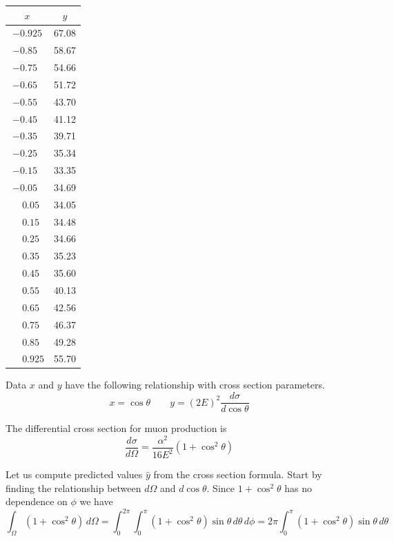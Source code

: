 \documentclass[12pt]{article}
\begin{document}
\begin{center}
\begin{tabular}{|c|c|}
\hline
$x$ & $y$\\
\hline
$-0.925$ & 67.08\\
$-0.85\phantom{0}$ & 58.67\\
$-0.75\phantom{0}$ & 54.66\\
$-0.65\phantom{0}$ & 51.72\\
$-0.55\phantom{0}$ & 43.70\\
$-0.45\phantom{0}$ & 41.12\\
$-0.35\phantom{0}$ & 39.71\\
$-0.25\phantom{0}$ & 35.34\\
$-0.15\phantom{0}$ & 33.35\\
$-0.05\phantom{0}$ & 34.69\\
$\phantom{+}0.05\phantom{0}$ & 34.05\\
$\phantom{+}0.15\phantom{0}$ & 34.48\\
$\phantom{+}0.25\phantom{0}$ & 34.66\\
$\phantom{+}0.35\phantom{0}$ & 35.23\\
$\phantom{+}0.45\phantom{0}$ & 35.60\\
$\phantom{+}0.55\phantom{0}$ & 40.13\\
$\phantom{+}0.65\phantom{0}$ & 42.56\\
$\phantom{+}0.75\phantom{0}$ & 46.37\\
$\phantom{+}0.85\phantom{0}$ & 49.28\\
$\phantom{+}0.925$ & 55.70\\
\hline
\end{tabular}
\end{center}

\noindent
Data $x$ and $y$ have the following relationship with cross section parameters.
\begin{equation*}
x=\cos\theta
\qquad
y=(2E)^2\frac{d\sigma}{d\cos\theta}
\end{equation*}

\noindent
The differential cross section for muon production is
\begin{equation*}
\frac{d\sigma}{d\Omega}=\frac{\alpha^2}{16E^2}(1+\cos^2\theta)
\end{equation*}

\noindent
Let us compute predicted values $\hat{y}$ from the cross section formula.
Start by finding the relationship between $d\Omega$ and $d\cos\theta$.
Since $1+\cos^2\theta$ has no dependence on $\phi$ we have
\begin{equation*}
\int_\Omega(1+\cos^2\theta)\,d\Omega
=\int_0^{2\pi}\int_0^{\pi}(1+\cos^2\theta)\sin\theta\,d\theta\,d\phi
=2\pi\int_0^\pi(1+\cos^2\theta)\sin\theta\,d\theta
\end{equation*}
\end{document}

